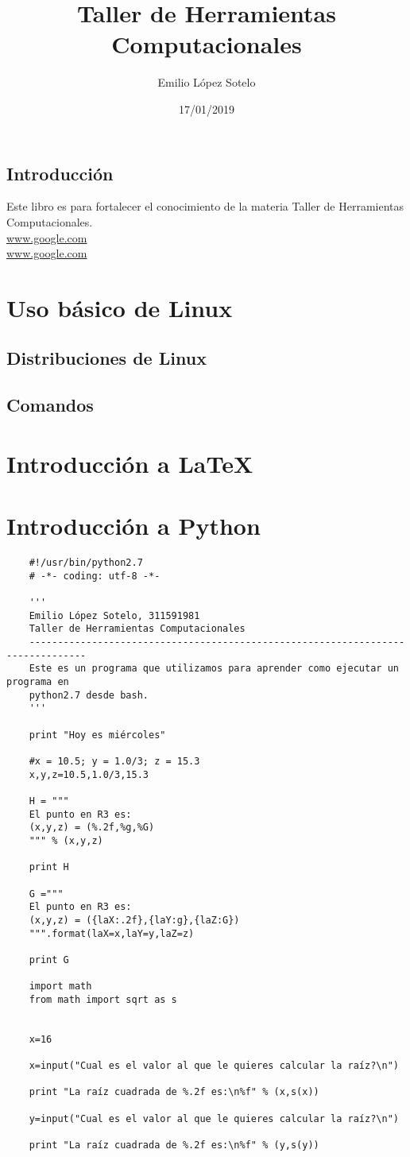 \documentclass{book}
\title{\Huge Taller de Herramientas Computacionales}
\author{Emilio López Sotelo}
\date{17/01/2019}
\begin{document}
	\maketitle
	\tableofcontents
	\section*{Introducción}
	Este libro es para fortalecer el conocimiento de la materia Taller de Herramientas Computacionales.
	\\
	\url{www.google.com}
	\\
	\hyperref[Google]{www.google.com}
	
	\chapter{Uso básico de Linux}
	\section{Distribuciones de Linux}
	\section{Comandos}
	
	\chapter{Introducción a LaTeX}
	
	\chapter{Introducción a Python}
	\begin{verbatim}
	#!/usr/bin/python2.7
	# -*- coding: utf-8 -*-
	
	'''
	Emilio López Sotelo, 311591981
	Taller de Herramientas Computacionales
	--------------------------------------------------------------------------------
	Este es un programa que utilizamos para aprender como ejecutar un programa en
	python2.7 desde bash.
	'''
	
	print "Hoy es miércoles"
	
	#x = 10.5; y = 1.0/3; z = 15.3
	x,y,z=10.5,1.0/3,15.3
	
	H = """
	El punto en R3 es:
	(x,y,z) = (%.2f,%g,%G)
	""" % (x,y,z)
	
	print H
	
	G ="""
	El punto en R3 es:
	(x,y,z) = ({laX:.2f},{laY:g},{laZ:G})
	""".format(laX=x,laY=y,laZ=z)
	
	print G
	
	import math
	from math import sqrt as s
	
	
	x=16
	
	x=input("Cual es el valor al que le quieres calcular la raíz?\n")
	
	print "La raíz cuadrada de %.2f es:\n%f" % (x,s(x))
	
	y=input("Cual es el valor al que le quieres calcular la raíz?\n")
	
	print "La raíz cuadrada de %.2f es:\n%f" % (y,s(y))
	\end{verbatim}
	
\end{document}
